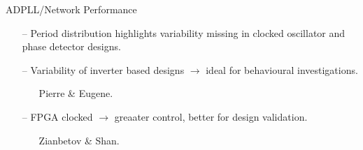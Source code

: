 \documentclass{beamer}
\begin{document}
\begin{frame}{ADPLL/Network Performance}
	\begin{itemize}
		\item[--]
			Period distribution highlights variability missing in clocked oscillator and phase detector designs.
		\item[--]
			Variability of inverter based designs $\rightarrow$ ideal for behavioural investigations.
			\begin{itemize}
				\item[]
					Pierre \& Eugene.
			\end{itemize} 
		\item[--]
			FPGA clocked $\rightarrow$ greaater control, better for design validation.
			\begin{itemize}
				\item[]
					Zianbetov \& Shan.
			\end{itemize} 
			
	\end{itemize}
\end{frame}
\end{document}
